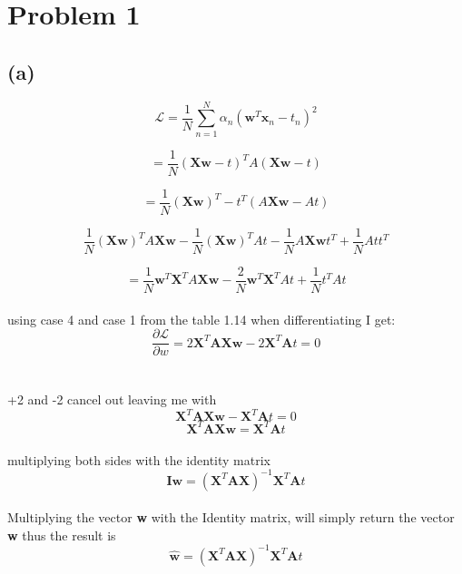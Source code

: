 \section{Problem 1}
\subsection{(a)}
$$ \mathcal{L} = \frac{1}{N} \sum\limits_{n=1}^{N} \alpha_{n} (\mathbf{w}^{T} \mathbf{x}_{n} - t_{n})^2 $$ 

$$  = \frac{1}{N} (\textbf{Xw}-t)^{T} A(\textbf{Xw}-t) $$

$$  = \frac{1}{N} (\textbf{Xw})^{T} - t^{T} (A\textbf{Xw}-At) $$

$$ \frac{1}{N} (\textbf{Xw})^{T} A\textbf{Xw} - \frac{1}{N} (\textbf{Xw})^{T} At  - \frac{1}{N} A\textbf{Xw}t^{T} + \frac{1}{N} Att^{T} $$

$$  = \frac{1}{N} \textbf{w}^{T} \textbf{X}^{T} A \textbf{Xw} - \frac{2}{N}\textbf{w}^{T}\textbf{X}^T A t + \frac{1}{N}t^{T} A t $$
\\
using case 4 and case 1 from the table 1.14 when differentiating I get:
\\
$$\frac{\partial\mathcal{L}}{\partial w} = 2 \textbf{X}^{T} \textbf{A} \textbf{Xw} - 2 \textbf{X}^{T} \textbf{A} t = 0$$
\\
\\
+2 and -2 cancel out leaving me with 
$$ \textbf{X}^{T} \textbf{A} \textbf{Xw} - \textbf{X}^{T} \textbf{A} t = 0 $$
$$ \textbf{X}^{T} \textbf{A} \textbf{Xw} = \textbf{X}^{T} \textbf{A} t $$
\\
multiplying both sides with the identity matrix
\\
$$ \textbf{I}\textbf{w} = (\textbf{X}^{T} \textbf{A} \textbf{X})^{-1} \textbf{X}^{T} \textbf{A} t $$
\\
Multiplying the vector \textbf{w} with the Identity matrix, will simply return the vector \textbf{w} thus the result is
$$ \hat{\textbf{w}} = (\textbf{X}^{T} \textbf{A} \textbf{X})^{-1} \textbf{X}^{T} \textbf{A} t $$
